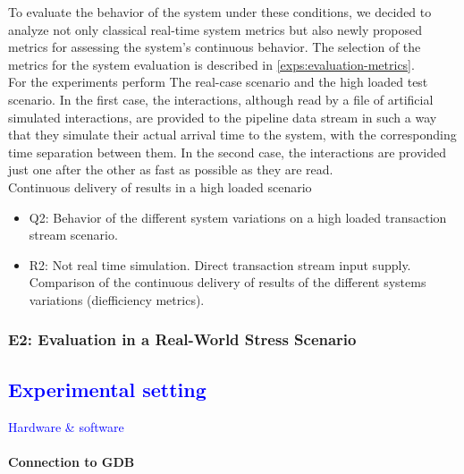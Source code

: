 To evaluate the behavior of the system under these conditions, we decided to analyze not only classical real-time system metrics but also newly proposed metrics for assessing the system's continuous behavior. The selection of the metrics for the system evaluation is described in \ref{exps:evaluation-metrics}.\\

For the experiments perform The real-case scenario and the high loaded test scenario. In the first case, the interactions, although read by a file of artificial simulated interactions, are provided to the pipeline data stream in such a way that they simulate their actual arrival time to the system, with the corresponding time separation between them. In the second case, the interactions are provided just one after the other as fast as possible as they are read.\\

Continuous delivery of results in a high loaded scenario

\begin{itemize}
  \item Q2: Behavior of the different system variations on a high loaded transaction stream scenario.
  \item R2: Not real time simulation. Direct transaction stream input supply. Comparison of the continuous delivery of results of the different systems variations (diefficiency metrics).
\end{itemize}

\subsubsection{E2: Evaluation in a Real-World Stress Scenario}

\textcolor{blue}{
\subsection{Experimental setting} 
Hardware \& software
}


\paragraph*{Connection to GDB}

